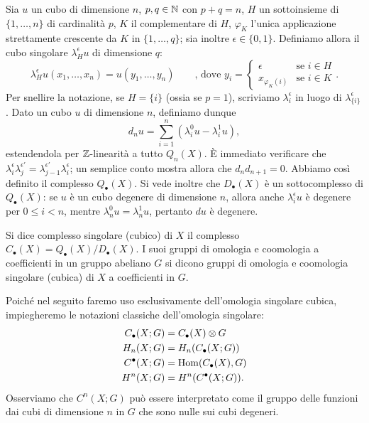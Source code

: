 Sia $u$ un cubo di dimensione $n$, $p,q\in\mathbb{N}$ con $p+q=n$, $H$ un sottoinsieme di $\{1,\ldots,n\}$ di cardinalità $p$, $K$ il complementare di $H$, $\varphi_K$ l'unica applicazione strettamente crescente da $K$ in $\{1,\ldots,q\}$; sia inoltre $\epsilon\in\{0,1\}$. Definiamo allora il cubo singolare $\lambda^\epsilon_Hu$ di dimensione $q$:
$$
\lambda^\epsilon_Hu(x_1,\ldots,x_n)=u(y_1,\ldots,y_n)\qquad\text{, dove }y_i=\begin{cases}\epsilon&\text{se $i\in H$}\\x_{\varphi_K(i)}&\text{se $i\in K$}\end{cases}.
$$
Per snellire la notazione, se $H=\{i\}$ (ossia se $p=1$), scriviamo $\lambda^\epsilon_i$ in luogo di $\lambda^\epsilon_{\{i\}}$. Dato un cubo $u$ di dimensione $n$, definiamo dunque
$$
d_nu=\sum_{i=1}^n(\lambda^0_iu-\lambda^1_iu),
$$
estendendola per $\mathbb{Z}$-linearità a tutto $Q_n(X)$. È immediato verificare che $\lambda^\epsilon_i\lambda^{\epsilon'}_j=\lambda^{\epsilon'}_{j-1}\lambda^\epsilon_i$; un semplice conto mostra allora che $d_nd_{n+1}=0$. Abbiamo così definito il complesso $Q_\bullet(X)$. Si vede inoltre che $D_\bullet(X)$ è un sottocomplesso di $Q_\bullet(X)$: se $u$ è un cubo degenere di dimensione $n$, allora anche $\lambda^\epsilon_iu$ è degenere per $0\le i<n$, mentre $\lambda^0_nu=\lambda^1_nu$, pertanto $du$ è degenere.
\begin{definition}
Si dice complesso singolare (cubico) di $X$ il complesso $C_\bullet(X)=Q_\bullet(X)/D_\bullet(X)$. I suoi gruppi di omologia e coomologia a coefficienti in un gruppo abeliano $G$ si dicono gruppi di omologia e coomologia singolare (cubica) di $X$ a coefficienti in $G$.
\end{definition}
Poiché nel seguito faremo uso esclusivamente dell'omologia singolare cubica, impiegheremo le notazioni classiche dell'omologia singolare: 
\begin{align*}
C_\bullet(X;G)&=C_\bullet(X)\mathbin{\otimes} G\\
H_n(X;G)&=H_n(C_\bullet(X;G))\\
C^\bullet(X;G)&=\operatorname{Hom}(C_\bullet(X),G)\\
H^n(X;G)&=H^n(C^\bullet(X;G)).
\end{align*}
Osserviamo che $C^n(X;G)$ può essere interpretato come il gruppo delle funzioni dai cubi di dimensione $n$ in $G$ che sono nulle sui cubi degeneri.

